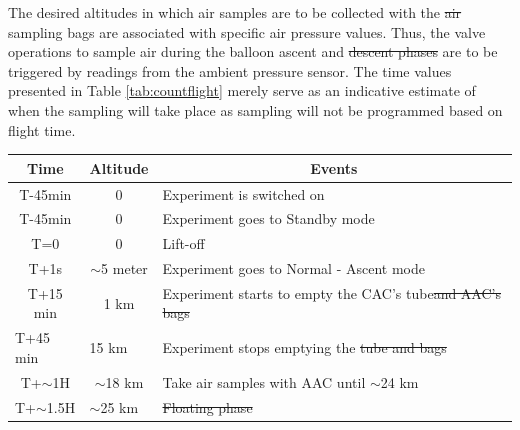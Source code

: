 \documentclass[a4paper,12pt,twoside]{article}
\providecommand{\DIFaddtex}[1]{{\protect\color{blue}\uwave{#1}}} %
\providecommand{\DIFdeltex}[1]{{\protect\color{red}\sout{#1}}}                      %
\providecommand{\DIFaddbegin}{} %
\providecommand{\DIFaddend}{} %
\providecommand{\DIFdelbegin}{} %
\providecommand{\DIFdelend}{} %
\providecommand{\DIFaddFL}[1]{\DIFadd{#1}} %
\providecommand{\DIFdelFL}[1]{\DIFdel{#1}} %
\providecommand{\DIFaddbeginFL}{} %
\providecommand{\DIFaddendFL}{} %
\providecommand{\DIFdelbeginFL}{} %
\providecommand{\DIFdelendFL}{} %
\providecommand{\DIFadd}[1]{\texorpdfstring{\DIFaddtex{#1}}{#1}} %
\providecommand{\DIFdel}[1]{\texorpdfstring{\DIFdeltex{#1}}{}} %
\newcommand{\DIFscaledelfig}{0.5}
\newlength{\DIFdelgraphicswidth} %
\newlength{\DIFdelgraphicsheight} %
\newcommand{\DIFaddincludegraphics}[2][]{{\color{blue}\fbox{\DIFOincludegraphics[#1]{#2}}}} %
\newcommand{\DIFdelincludegraphics}[2][]{%
\sbox{\DIFdelgraphicsbox}{\DIFOincludegraphics[#1]{#2}}%
\settoboxwidth{\DIFdelgraphicswidth}{\DIFdelgraphicsbox} %
\settoboxtotalheight{\DIFdelgraphicsheight}{\DIFdelgraphicsbox} %
\scalebox{\DIFscaledelfig}{%
\parbox[b]{\DIFdelgraphicswidth}{\usebox{\DIFdelgraphicsbox}\\[-\baselineskip] \rule{\DIFdelgraphicswidth}{0em}}\llap{\resizebox{\DIFdelgraphicswidth}{\DIFdelgraphicsheight}{%
\setlength{\unitlength}{\DIFdelgraphicswidth}%
\begin{picture}(1,1)%
\thicklines\linethickness{2pt} %
{\color[rgb]{1,0,0}\put(0,0){\framebox(1,1){}}}%
{\color[rgb]{1,0,0}\put(0,0){\line( 1,1){1}}}%
{\color[rgb]{1,0,0}\put(0,1){\line(1,-1){1}}}%
\end{picture}%
}\hspace*{3pt}}} %
} %
\DeclareRobustCommand{\DIFaddbegin}{\DIFOaddbegin \let\includegraphics\DIFaddincludegraphics} %
\DeclareRobustCommand{\DIFaddend}{\DIFOaddend \let\includegraphics\DIFOincludegraphics} %
\DeclareRobustCommand{\DIFdelbegin}{\DIFOdelbegin \let\includegraphics\DIFdelincludegraphics} %
\DeclareRobustCommand{\DIFdelend}{\DIFOaddend \let\includegraphics\DIFOincludegraphics} %
\DeclareRobustCommand{\DIFaddbeginFL}{\DIFOaddbeginFL \let\includegraphics\DIFaddincludegraphics} %
\DeclareRobustCommand{\DIFaddendFL}{\DIFOaddendFL \let\includegraphics\DIFOincludegraphics} %
\DeclareRobustCommand{\DIFdelbeginFL}{\DIFOdelbeginFL \let\includegraphics\DIFdelincludegraphics} %
\DeclareRobustCommand{\DIFdelendFL}{\DIFOaddendFL \let\includegraphics\DIFOincludegraphics} %
\begin{document}
The desired altitudes in which air samples are to be collected with the \DIFdelbegin \DIFdel{air }\DIFdelend sampling bags are associated with specific air pressure values. Thus, the valve operations to sample air during the balloon ascent and \DIFdelbegin \DIFdel{descent phases }\DIFdelend \DIFaddbegin \DIFadd{Descent Phases }\DIFaddend are to be triggered by readings from the ambient pressure sensor. The time values presented in Table \ref{tab:countflight} merely serve as an indicative estimate of when the sampling will take place as sampling will not be programmed based on flight time.

\begin{table}[H]
\centering


\begin{tabular}{|l|l|l|}
\hline
\multicolumn{1}{|c|}{\textbf{Time}}       & \multicolumn{1}{c|}{\textbf{Altitude}}      & \multicolumn{1}{c|}{\textbf{Events}}                              \\ \hline
\multicolumn{1}{|c|}{T-45min}    & \multicolumn{1}{c|}{0}             & Experiment is switched on                                \\ \hline
\multicolumn{1}{|c|}{T-45min}    & \multicolumn{1}{c|}{0}             & Experiment goes to Standby mode                          \\ \hline
\multicolumn{1}{|c|}{T=0}        & \multicolumn{1}{c|}{0}             & Lift-off                                                 \\ \hline
\multicolumn{1}{|c|}{T+1s}       & \multicolumn{1}{c|}{$\sim$5 meter} & Experiment goes to Normal - Ascent mode                  \\ \hline
\multicolumn{1}{|c|}{T+15 min}   & \multicolumn{1}{c|}{1 km}          & Experiment starts to empty the CAC's tube\DIFdelbeginFL \DIFdelFL{and AAC's bags }\DIFdelendFL \\ \hline
T+45 min                         & 15 km                              & Experiment stops emptying the \DIFdelbeginFL \DIFdelFL{tube and bags              }\DIFdelendFL \DIFaddbeginFL \DIFaddFL{tubes              }\DIFaddendFL \\ \hline
\multicolumn{1}{|c|}{T+$\sim$1H} & \multicolumn{1}{c|}{$\sim$18 km}   & Take air samples with AAC until $\sim$24 km                       \\ \hline
T+$\sim$1.5H                     & $\sim$25 km                        & \DIFdelbeginFL \DIFdelFL{Floating phase                                           }\DIFdelendFL \DIFaddbeginFL \DIFaddFL{Float Phase                                           }\DIFaddendFL \\ \hline

\end{tabular}
\end{table}
\end{document}
